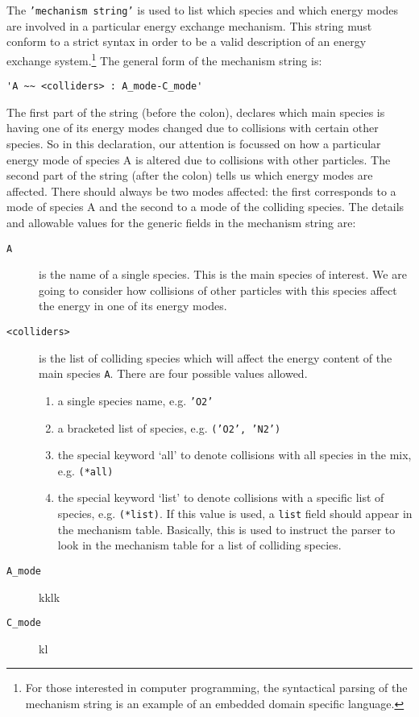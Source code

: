 The \texttt{'mechanism string'} is used to list which species and which
energy modes are involved in a particular energy exchange mechanism.
This string must conform to a strict syntax in order to be a valid
description of an energy exchange system.\footnote{For those interested
in computer programming, the syntactical parsing of the 
mechanism string is an example of an embedded domain specific language.}
The general form of the mechanism string is:
\begin{verbatim}
'A ~~ <colliders> : A_mode-C_mode'
\end{verbatim}
The first part of the string (before the colon), declares which main species
is having one of its energy modes changed due to collisions with certain
other species.
So in this declaration, our attention is focussed on how a particular
energy mode of species A is altered due to collisions with other
particles.
The second part of the string (after the colon) tells us which energy modes are
affected.
There should always be two modes affected: the first corresponds to a mode
of species A and the second to a mode of the colliding species.
The details and allowable values for the generic fields in the mechanism string are:
\begin{description}
\item[\texttt{A}] is the name of a single species. This is the main species of interest.
                  We are going to consider how collisions of other particles with this
                  species affect the energy in one of its energy modes.
\item[\texttt{<colliders>}] is the list of colliding species which will affect the
                  energy content of the main species \texttt{A}. There are four possible
                  values allowed.
  \begin{enumerate}
  \item a single species name, e.g. \texttt{'O2'}
  \item a bracketed list of species, e.g. \texttt{('O2', 'N2')}
  \item the special keyword `all' to denote collisions with all species in the mix, e.g. \texttt{(*all)}
  \item the special keyword `list' to denote collisions with a specific list of species, e.g. 
        \texttt{(*list)}. If this value is used, a \texttt{list} field should appear in
        the mechanism table. Basically, this is used to instruct the parser to look in the
        mechanism table for a list of colliding species.
  \end{enumerate}
\item[\texttt{A\_mode}] kklk
\item[\texttt{C\_mode}] kl
\end{description}




